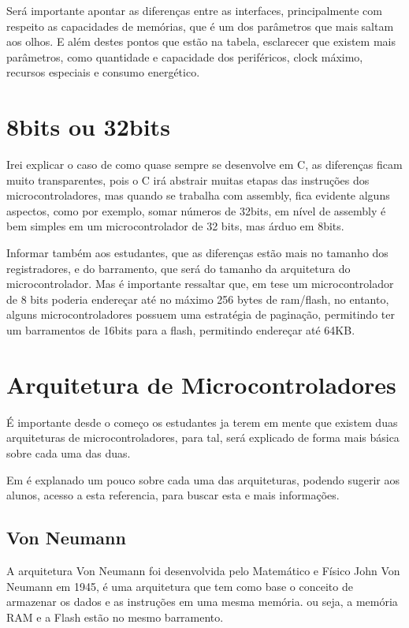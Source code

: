\documentclass[12pt,a4paper]{report}
\begin{document}
Será importante apontar as diferenças entre as interfaces, principalmente com respeito as capacidades de memórias, que é um dos parâmetros que mais saltam aos olhos. E além destes pontos que estão na tabela, esclarecer que existem mais parâmetros, como quantidade e capacidade dos periféricos, clock máximo, recursos especiais e consumo energético.


\section{8bits ou 32bits}

Irei explicar o caso de como quase sempre se desenvolve em C, as diferenças ficam muito transparentes, pois o C irá abstrair muitas etapas das instruções dos microcontroladores, mas quando se trabalha com assembly, fica evidente alguns aspectos, como por exemplo, somar números de 32bits, em nível de assembly é bem simples em um microcontrolador de 32 bits, mas árduo em 8bits.

Informar também aos estudantes, que as diferenças estão mais no tamanho dos registradores, e do barramento, que será do tamanho da arquitetura do microcontrolador. Mas é importante ressaltar que, em tese um microcontrolador de 8 bits poderia endereçar até no máximo 256 bytes de ram/flash, no entanto, alguns microcontroladores possuem uma estratégia de paginação, permitindo ter um barramentos de 16bits para a flash, permitindo endereçar até 64KB.

\section{Arquitetura de Microcontroladores}

É importante desde o começo os estudantes ja terem em mente que existem duas arquiteturas de microcontroladores, para tal, será explicado de forma mais básica sobre cada uma das duas.

Em \cite{ci:von_neu_harv_diff} é explanado um pouco sobre cada uma das arquiteturas, podendo sugerir aos alunos, acesso a esta referencia, para buscar esta e mais informações.

\subsection{Von Neumann}

A arquitetura Von Neumann foi desenvolvida pelo Matemático e Físico John Von Neumann em 1945, é uma arquitetura que tem como base o conceito de armazenar os dados e as instruções em uma mesma memória. ou seja, a memória RAM e a Flash estão no mesmo barramento.
\end{document}
